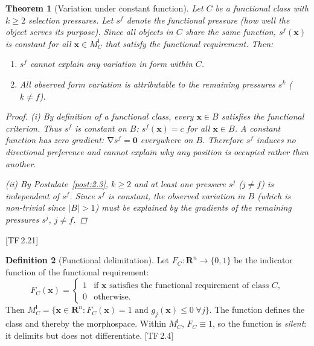 \documentclass[11pt, a4paper]{article}
\theoremstyle{definition}
\newtheorem{definition}{Definition}[section]
\theoremstyle{plain}
\newtheorem{theorem}[definition]{Theorem}
\theoremstyle{remark}
\newcommand{\MC}{M^{\mathsf{I}}_C}          %
\providecommand{\Rn}{}
\renewcommand{\Rn}{\mathbf{R}^n}            %
\newcommand{\abs}[1]{\lvert #1 \rvert}
\DeclareMathOperator{\grad}{\nabla}
\newcommand{\TF}[1]{\textnormal{[TF\,#1]}}  %
\begin{document}
\begin{theorem}[Variation under constant function]\label{thm:2.4}
Let $C$ be a functional class with $k \geq 2$ selection pressures.
Let $s^f$ denote the functional pressure (how well the object serves its
purpose). Since all objects in $C$ share the same function,
$s^f(\bm{x})$ is constant for all $\bm{x} \in \MC$ that satisfy the
functional requirement. Then:
\begin{enumerate}[label=(\roman*),nosep]
  \item $s^f$ cannot explain any variation in form within $C$.
  \item All observed form variation is attributable to the remaining
    pressures $s^k$ ($k \neq f$).
\end{enumerate}

\begin{proof}
\textit{(i)}\; By definition of a functional class, every $\bm{x} \in B$
satisfies the functional criterion. Thus $s^f$ is constant on $B$:
$s^f(\bm{x}) = c$ for all $\bm{x} \in B$. A constant function has
zero gradient: $\grad s^f = \bm{0}$ everywhere on $B$. Therefore $s^f$
induces no directional preference and cannot explain why any position is
occupied rather than another.

\textit{(ii)}\; By Postulate~\ref{post:2.3}, $k \geq 2$ and at least one
pressure $s^j$ ($j \neq f$) is independent of $s^f$. Since $s^f$ is
constant, the observed variation in $B$ (which is non-trivial since
$\abs{B} > 1$) must be explained by the gradients of the remaining
pressures $s^j$, $j \neq f$. \qedhere
\end{proof}
\end{theorem}

\TF{2.21}

\begin{definition}[Functional delimitation]\label{def:2.5}
Let $F_C : \Rn \to \{0, 1\}$ be the indicator function of the
functional requirement:
\[
  F_C(\bm{x}) =
  \begin{cases}
    1 & \text{if } \bm{x} \text{ satisfies the functional requirement
        of class } C, \\
    0 & \text{otherwise.}
  \end{cases}
\]
Then $\MC = \{\bm{x} \in \Rn : F_C(\bm{x}) = 1 \text{ and }
g_j(\bm{x}) \leq 0 \; \forall j\}$.
The function defines the class and thereby the morphospace.
Within $\MC$, $F_C \equiv 1$, so the function is \emph{silent}:
it delimits but does not differentiate. \TF{2.4}
\end{definition}
\end{document}
